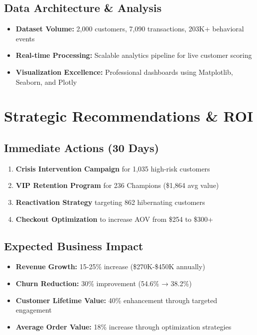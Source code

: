 \documentclass[11pt,letterpaper]{article}
\begin{document}
\subsection{Data Architecture \& Analysis}
\begin{itemize}[leftmargin=*]
\item \textbf{Dataset Volume:} 2,000 customers, 7,090 transactions, 203K+ behavioral events
\item \textbf{Real-time Processing:} Scalable analytics pipeline for live customer scoring
\item \textbf{Visualization Excellence:} Professional dashboards using Matplotlib, Seaborn, and Plotly
\end{itemize}

\section{Strategic Recommendations \& ROI}

\subsection{Immediate Actions (30 Days)}
\begin{enumerate}[leftmargin=*]
\item \textbf{Crisis Intervention Campaign} for 1,035 high-risk customers
\item \textbf{VIP Retention Program} for 236 Champions (\$1,864 avg value)
\item \textbf{Reactivation Strategy} targeting 862 hibernating customers
\item \textbf{Checkout Optimization} to increase AOV from \$254 to \$300+
\end{enumerate}

\subsection{Expected Business Impact}
\begin{itemize}[leftmargin=*]
\item \textbf{Revenue Growth:} 15-25\% increase (\$270K-\$450K annually)
\item \textbf{Churn Reduction:} 30\% improvement (54.6\% → 38.2\%)
\item \textbf{Customer Lifetime Value:} 40\% enhancement through targeted engagement
\item \textbf{Average Order Value:} 18\% increase through optimization strategies
\end{itemize}
\end{document}
